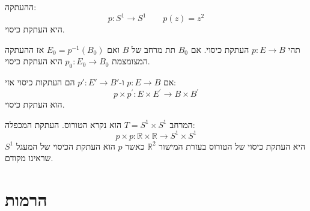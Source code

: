 \documentclass{tstextbook}
\begin{document}
\begin{example}
ההעתקה:
$$p:S^{1}\to S^{1}\qquad p(z)=z^{2}$$
היא העתקת כיסוי.

\end{example}
\begin{proposition}
תהי \(p:E\to B\) העתקת כיסוי. אם \(B_{0}\) תת מרחב של \(B\) ואם \(E_{0}=p ^{-1}(B_{0})\) אז ההעתקה המצומצמת \(p_{0}:E_{0}\to B_{0}\) היא העתקת כיסוי.

\end{proposition}
\begin{proposition}
אם \(p:E\to B\) ו-\(p':E'\to B'\) הם העתקות כיסוי אזי:
$$p\times p^{\prime}:E\times E^{\prime}\to B\times B^{\prime}$$
הוא העתקת כיסוי.

\end{proposition}
\begin{example}[טורוס]
המרחב \(T=S^{1}\times S^{1}\) הוא נקרא הטורוס. העתקת המכפלה:
$$p\times p:\mathbb{R}\times\mathbb{R}\longrightarrow S^{1}\times S^{1}$$
היא העתקת כיסוי של הטורוס בעזרת המישור \(\mathbb{R}^{2}\) כאשר \(p\) הוא העתקת הכיסוי של המעגל \(S^{1}\) שראינו מקודם.

\end{example}
\section{הרמות}
\end{document}
